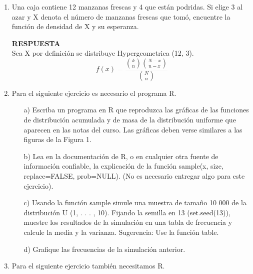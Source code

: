 \documentclass[11pt,letterpaper]{article}
\newcommand{\res}{\textbf{RESPUESTA}\\}
\begin{document}
\begin{enumerate}
\item Una caja contiene 12 manzanas frescas y 4 que están podridas. Si elige 3 al azar y X denota el
número de manzanas frescas que tomó, encuentre la función de densidad de X y su esperanza.

\res 

Sea X por definición se distribuye Hypergeometrica (12, 3).
\begin{equation*}
f(x)= \frac{{k\choose n}{N-x\choose n-x}}{{N\choose n}}
\end{equation*}

\item Para el siguiente ejercicio es necesario el programa \textsc{R}.
\begin{itemize}
\item[a)] Escriba un programa en \textsc{R}  que reproduzca las gráficas de las funciones de distribución
acumulada y de masa de la distribución uniforme que aparecen en las notas del curso. Las gráficas deben verse similares a las figuras de la Figura 1.

\item[b)] Lea en la documentación de \textsc{R}, o en cualquier otra fuente de información confiable,
la explicación de la función sample(x, size, replace=FALSE, prob=NULL). (No es necesario entregar algo para este ejercicio).

\item[c)] Usando la función sample simule una muestra de tamaño 10 000 de la distribución
U (1, . . . , 10). Fijando la semilla en 13 (set.seed(13)), muestre los resultados de la
simulación en una tabla de frecuencia y calcule la media y la varianza. Sugerencia: Use la función table.
\item[d)] Grafique las frecuencias de la simulación anterior.
\end{itemize}


\item Para el siguiente ejercicio también necesitamos R.



\end{enumerate}
\end{document}
